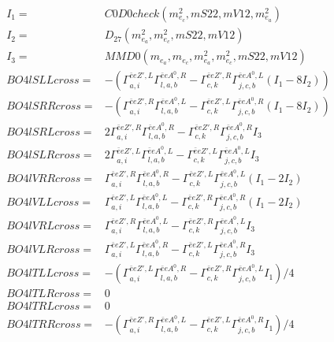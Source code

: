 \documentclass[A4,landscape]{article}
\begin{document}
\begin{align} 
I_1 = & C0D0check(m^2_{e_{{c}}}, mS22, mV12, m^2_{e_{{a}}}) \\ 
I_2 = & D_{27}(m^2_{e_{{a}}}, m^2_{e_{{c}}}, mS22, mV12) \\ 
I_3 = & MMD0(m_{e_{{a}}}, m_{e_{{c}}}, m^2_{e_{{a}}}, m^2_{e_{{c}}}, mS22, mV12) \\ 
  BO4lSLLcross= & -( \Gamma^{\bar{e}e {Z'} ,L}_{a, i} \Gamma^{\bar{e}e A^0 ,R}_{l, a, b} - \Gamma^{\bar{e}e {Z'} ,R} _{c, k} \Gamma^{\bar{e}e A^0 ,L}_{j, c, b} (I_1 - 8 I_2)) \\ 
  BO4lSRRcross= & -( \Gamma^{\bar{e}e {Z'} ,R}_{a, i} \Gamma^{\bar{e}e A^0 ,L}_{l, a, b} - \Gamma^{\bar{e}e {Z'} ,L} _{c, k} \Gamma^{\bar{e}e A^0 ,R}_{j, c, b} (I_1 - 8 I_2)) \\ 
  BO4lSRLcross= & 2  \Gamma^{\bar{e}e {Z'} ,R}_{a, i} \Gamma^{\bar{e}e A^0 ,R}_{l, a, b} - \Gamma^{\bar{e}e {Z'} ,R} _{c, k} \Gamma^{\bar{e}e A^0 ,R}_{j, c, b} I_3 \\ 
  BO4lSLRcross= & 2  \Gamma^{\bar{e}e {Z'} ,L}_{a, i} \Gamma^{\bar{e}e A^0 ,L}_{l, a, b} - \Gamma^{\bar{e}e {Z'} ,L} _{c, k} \Gamma^{\bar{e}e A^0 ,L}_{j, c, b} I_3 \\ 
  BO4lVRRcross= &  \Gamma^{\bar{e}e {Z'} ,R}_{a, i} \Gamma^{\bar{e}e A^0 ,R}_{l, a, b} - \Gamma^{\bar{e}e {Z'} ,L} _{c, k} \Gamma^{\bar{e}e A^0 ,L}_{j, c, b} (I_1 - 2 I_2) \\ 
  BO4lVLLcross= &  \Gamma^{\bar{e}e {Z'} ,L}_{a, i} \Gamma^{\bar{e}e A^0 ,L}_{l, a, b} - \Gamma^{\bar{e}e {Z'} ,R} _{c, k} \Gamma^{\bar{e}e A^0 ,R}_{j, c, b} (I_1 - 2 I_2) \\ 
  BO4lVRLcross= &  \Gamma^{\bar{e}e {Z'} ,R}_{a, i} \Gamma^{\bar{e}e A^0 ,L}_{l, a, b} - \Gamma^{\bar{e}e {Z'} ,R} _{c, k} \Gamma^{\bar{e}e A^0 ,L}_{j, c, b} I_3 \\ 
  BO4lVLRcross= &  \Gamma^{\bar{e}e {Z'} ,L}_{a, i} \Gamma^{\bar{e}e A^0 ,R}_{l, a, b} - \Gamma^{\bar{e}e {Z'} ,L} _{c, k} \Gamma^{\bar{e}e A^0 ,R}_{j, c, b} I_3 \\ 
  BO4lTLLcross= & -( \Gamma^{\bar{e}e {Z'} ,L}_{a, i} \Gamma^{\bar{e}e A^0 ,R}_{l, a, b} - \Gamma^{\bar{e}e {Z'} ,R} _{c, k} \Gamma^{\bar{e}e A^0 ,L}_{j, c, b} I_1)/4 \\ 
  BO4lTLRcross= & 0 \\ 
  BO4lTRLcross= & 0 \\ 
  BO4lTRRcross= & -( \Gamma^{\bar{e}e {Z'} ,R}_{a, i} \Gamma^{\bar{e}e A^0 ,L}_{l, a, b} - \Gamma^{\bar{e}e {Z'} ,L} _{c, k} \Gamma^{\bar{e}e A^0 ,R}_{j, c, b} I_1)/4 \\ 
\end{align} 
\end{document}
